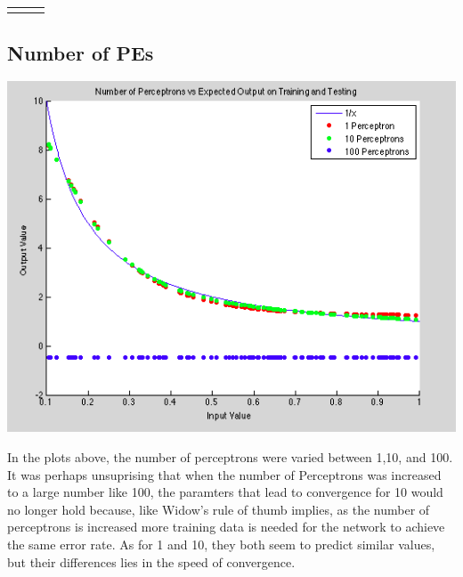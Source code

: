 \documentclass[epsfig]{article}
\begin{document}
\begin{table}[htbp]
{\begin{tabular}{p{4cm} p{.05cm} p{8cm}}
 \bottomrule \noalign{\smallskip}
 
  \end{tabular}
   } %
\end{table}

\subsection*{Number of PEs}
\begin{center}
\includegraphics[scale=0.8]{pic3}
\end{center}
In the plots above, the number of perceptrons were varied between 1,10, and 100. It was perhaps unsuprising that when the number of Perceptrons was increased to a large number like 100, the paramters that lead to convergence for 10 would no longer hold because, like Widow's rule of thumb implies, as the number of perceptrons is increased more training data is needed for the network to achieve the same error rate. As for 1 and 10, they both seem to predict similar values, but their differences lies in the speed of convergence.
\end{document}
